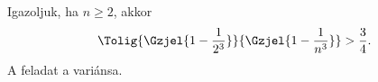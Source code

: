 Igazoljuk, ha $n\ge 2$, akkor 
$$
\Tolig{\Gzjel{1-\frac{1}{2^3}}}{\Gzjel{1-\frac{1}{n^3}}} > \frac{3}{4}.
$$
A feladat a  variánsa.
